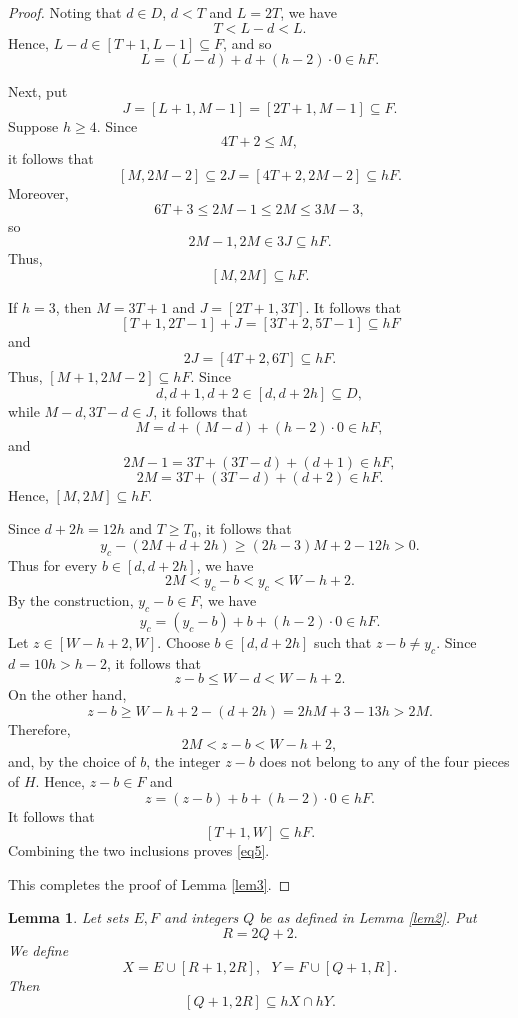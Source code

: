 \documentclass[reqno,12pt,twoside]{article}
\numberwithin{equation}{section}
\newtheorem{lemma}[theorem]{Lemma}
\begin{document}
\begin{proof}
Noting that $d\in D$, $d<T$ and $L=2T$, we have
\[
 T<L-d<L.
\]
Hence, $L-d\in[T+1,L-1]\subseteq F$, and so
\[
 L=(L-d)+d+(h-2)\cdot0\in hF.
\]

Next, put
\[
 J=[L+1,M-1]=[2T+1,M-1]\subseteq F.
\]
Suppose $h\ge4$. Since
\[
 4T+2\le M,
\]
it follows that
\[
 [M,2M-2]\subseteq2J=[4T+2,2M-2]\subseteq hF.
\]
Moreover,
\[
 6T+3\le2M-1\le2M\le3M-3,
\]
so
\[
 2M-1,2M\in3J\subseteq hF.
\]
Thus,
\[
 [M,2M]\subseteq hF.
\]


If $h=3$, then $M=3T+1$ and $J=[2T+1,3T]$. It follows that
\[
 [T+1,2T-1]+J=[3T+2,5T-1]\subseteq hF
\]
and
\[
 2J=[4T+2,6T]\subseteq hF.
\]
Thus, $[M+1,2M-2]\subseteq hF$. Since 
\[
 d,d+1,d+2\in[d,d+2h]\subseteq D,
\]
while $M-d,3T-d\in J$, it follows that
\[
 M=d+(M-d)+(h-2)\cdot0\in hF,
\]
and
\[
 2M-1=3T+(3T-d)+(d+1)\in hF,
\]
\[
 2M=3T+(3T-d)+(d+2)\in hF.
\]
Hence, $[M,2M]\subseteq hF$.

Since $d+2h=12h$ and $T\ge T_0$, it follows that
\[
 y_c-(2M+d+2h)\ge(2h-3)M+2-12h>0.
\]
Thus for every $b\in[d,d+2h]$, we have
\[
 2M<y_c-b<y_c<W-h+2.
\]
By the construction, $y_c-b\in F$, we have
\[
 y_c=(y_c-b)+b+(h-2)\cdot0\in hF.
\]
Let $z\in[W-h+2,W]$. Choose $b\in[d,d+2h]$ such that $z-b\ne y_c$. Since $d=10h>h-2$, it follows that
\[
 z-b\le W-d<W-h+2.
\]
On the other hand,
\[
 z-b\ge W-h+2-(d+2h)=2hM+3-13h>2M.
\]
Therefore,
\[
 2M<z-b<W-h+2,
\]
and, by the choice of $b$, the integer $z-b$ does not belong to any of the four pieces of $H$. Hence, $z-b\in F$ and
\[
 z=(z-b)+b+(h-2)\cdot0\in hF.
\]
It follows that
\[
 [T+1,W]\subseteq hF.
\]
Combining the two inclusions proves \eqref{eq5}. 

This completes the proof of Lemma \ref{lem3}.
\end{proof}

\begin{lemma}\label{lem4}
Let sets $E,F$ and integers $Q$ be as defined in Lemma \ref{lem2}. Put
\[
 R=2Q+2.
\]
We define
\[
X=E\cup [R+1,2R],~~~Y=F\cup [Q+1,R].
\]
Then
\begin{equation}\label{eq7}
[Q+1,2R]\subseteq hX\cap hY.
\end{equation}

\end{lemma}
\end{document}
